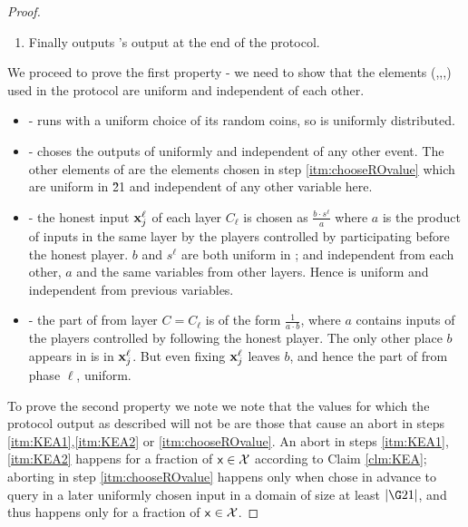 \documentclass{article}
\begin{document}
\begin{proof}
\begin{enumerate}
\begin{enumerate}
   \end{enumerate}
\item Finally \advvprime outputs \adv's output \advoutput at the end of the protocol.
 \end{enumerate}
We proceed to prove the first property - we need to show that the elements (\advrand,\honestinputs,\beaconrand,\oraclerand) used in the protocol are uniform 
and independent of each other.
\begin{itemize}
 \item \advrand - \advvprime runs \adv with a uniform choice of its random coins, so \advrand is uniformly distributed.
 \item \oraclerand - \advv choses the outputs of \RO uniformly and independent of any other event. The other elements of \oraclerand are the elements 
 chosen in step \ref{itm:chooseROvalue} which are uniform in \G21 and independent of any other variable here.
 \item \honestinputs - the honest input $\mathbf{x}_j^\ell$ of each layer $C_\ell$ is chosen as $\frac{b\cdot s^\ell}{a}$ where $a$ is the product of inputs in the same layer by the players controlled by \adv participating before the honest player. $b$ and $s^\ell$ are both uniform in \domainlayer; and independent from each other, $a$ and the same variables from other layers. Hence \honestinputs is uniform and independent from previous variables.
 \item \beaconrand - the part of \beaconrand from layer $C=C_\ell$ is of the form $\frac{1}{a\cdot b}$, where $a$ contains inputs
 of the players controlled by \adv following the honest player. The only other place $b$ appears in is in $\mathbf{x}^\ell_j$. But even fixing $\mathbf{x}^\ell_j$
 leaves $b$, and hence the part of \beaconrand from phase $\ell$, uniform.
 
\end{itemize}
To prove the second property we note we note that the values \rand for which the protocol output as described will not be 
are those that cause an abort in steps \ref{itm:KEA1},\ref{itm:KEA2} or \ref{itm:chooseROvalue}.
An abort in steps \ref{itm:KEA1},\ref{itm:KEA2} happens for a \negl fraction of $\mathsf{x}\in \mathcal X$ according to Claim \ref{clm:KEA};
aborting in step \ref{itm:chooseROvalue} happens only when \adv chose in advance to query \RO in a later uniformly chosen input in a domain of size at 
least $|\G21|$, and thus happens only for a \negl fraction of $\mathsf{x}\in \mathcal X$.


\end{proof}
\end{document}
